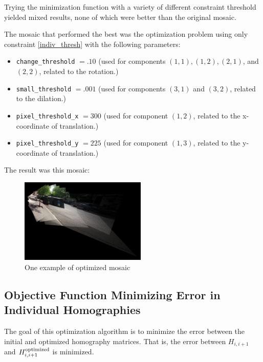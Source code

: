 \documentclass{article}
\begin{document}
Trying the minimization function with a variety of different constraint
threshold yielded mixed results, none of which were better than the original
mosaic.

The mosaic that performed the best was the optimization problem using only
constraint \ref{indiv_thresh} with the following parameters:

\begin{itemize}

\item \verb|change_threshold| $=.10$ (used for components $(1, 1), (1, 2), (2, 1)$, and $(2, 2)$, related to the rotation.)

\item \verb|small_threshold| $=.001$ (used for components $(3, 1)$ and $(3, 2)$, related to the dilation.)

\item \verb|pixel_threshold_x| $= 300$ (used for component $(1, 2)$, related to the x-coordinate of translation.)

\item \verb|pixel_threshold_y| $= 225$ (used for component $(1, 3)$, related to the y-coordinate of translation.)

\end{itemize}  

The result was this mosaic:

\begin{figure}[h!]
\centering
\includegraphics[width=6cm]{testset16test9/cummosaic0016_edit.jpg}
\caption{One example of optimized mosaic}
\end{figure}

\subsection{Objective Function Minimizing Error in Individual Homographies}

The goal of this optimization algorithm is to minimize the error between the
initial and optimized homography matrices. That is, the error between 
$H_{i, i + 1}$ and $H_{i, i+1}^{\textnormal{optimized}}$ is minimized.
\end{document}
